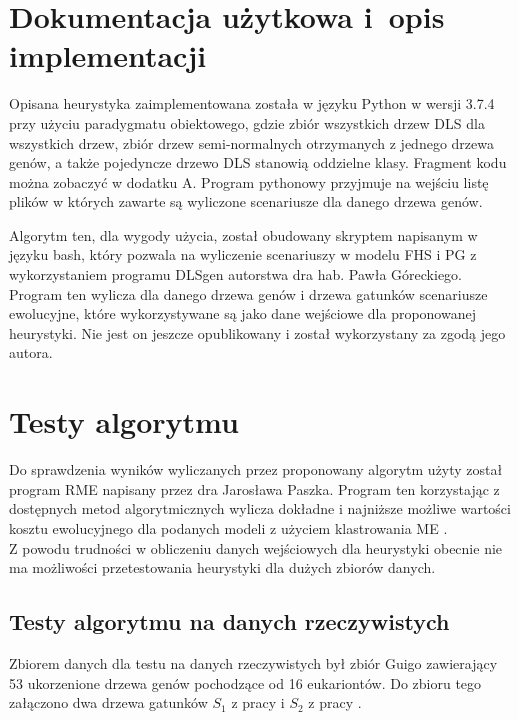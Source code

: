 \documentclass[licencjacka]{pracamgr}
\begin{document}
\section{Dokumentacja użytkowa i~opis implementacji}\label{r:impl}
Opisana heurystyka zaimplementowana została w języku Python w wersji 3.7.4 przy użyciu paradygmatu obiektowego, gdzie zbiór wszystkich drzew DLS dla wszystkich drzew, zbiór drzew semi-normalnych otrzymanych z jednego drzewa genów, a także pojedyncze drzewo DLS stanowią oddzielne klasy. Fragment kodu można zobaczyć w dodatku A. Program pythonowy przyjmuje na wejściu listę plików w których zawarte są wyliczone scenariusze dla danego drzewa genów.

Algorytm ten, dla wygody użycia, został obudowany skryptem napisanym w języku bash, który pozwala na wyliczenie scenariuszy w modelu FHS i PG z wykorzystaniem programu DLSgen autorstwa dra hab. Pawła Góreckiego. Program ten wylicza dla danego drzewa genów i drzewa gatunków scenariusze ewolucyjne, które wykorzystywane są jako dane wejściowe dla proponowanej heurystyki. Nie jest on jeszcze opublikowany i został wykorzystany za zgodą jego autora.


\section{Testy algorytmu}
Do sprawdzenia wyników wyliczanych przez proponowany algorytm użyty został program RME napisany przez dra Jarosława Paszka. Program ten korzystając z dostępnych metod algorytmicznych wylicza dokładne i najniższe możliwe wartości kosztu ewolucyjnego dla podanych modeli z użyciem klastrowania ME \cite{RME}.
\\
Z powodu trudności w obliczeniu danych wejściowych dla heurystyki obecnie nie ma możliwości przetestowania heurystyki dla dużych zbiorów danych.

\subsection{Testy algorytmu na danych rzeczywistych}
Zbiorem danych dla testu na danych rzeczywistych był zbiór Guigo zawierający 53 ukorzenione drzewa genów pochodzące od 16 eukariontów. Do zbioru tego załączono dwa drzewa gatunków $S_1$ z pracy \cite{Guigo1996} i $S_2$ z pracy \cite{Page1997RTI}. 
\end{document}
